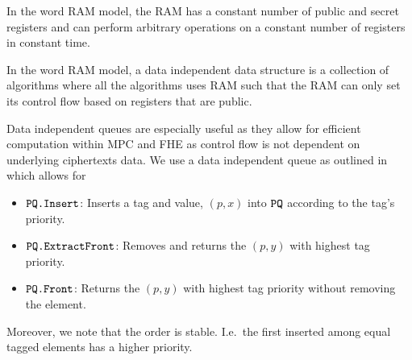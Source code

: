 \begin{definition}
	In the word RAM model, the RAM has a constant number of public and secret registers and can perform arbitrary operations on a constant number of registers in constant time.
\end{definition}

\begin{definition}
	In the word RAM model, a data independent data structure is a collection of algorithms where
	all the algorithms uses RAM such that the RAM can only set its	control flow based on registers that are public.
\end{definition}

Data independent queues are especially useful as they allow for efficient computation within MPC and FHE as control flow is not dependent
on underlying ciphertexts data. We use a data independent queue as outlined in \cite{mazloom2023efficient}
which allows for
\begin{itemize}
	\item $\texttt{PQ.Insert}$: Inserts a tag and value, $(p, x)$ into $\texttt{PQ}$ according to the tag's priority.
	\item $\texttt{PQ.ExtractFront}$: Removes and returns the $(p, y)$ with highest tag priority.
	\item $\texttt{PQ.Front}$: Returns the $(p, y)$ with highest tag priority without removing the element.
\end{itemize}
Moreover, we note that the order is stable. I.e.\ the first inserted among equal tagged elements has a higher priority.


